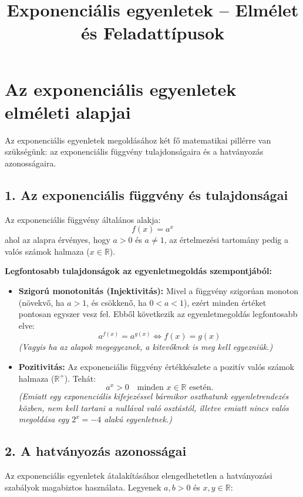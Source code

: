 \documentclass[11pt, a4paper]{article}
\title{\vspace{-1.5cm}\textbf{Exponenciális egyenletek -- Elmélet és Feladattípusok}}
\author{}
\date{}
\begin{document}
\maketitle
\vspace{-1.5cm}

\section*{Az exponenciális egyenletek elméleti alapjai}

Az exponenciális egyenletek megoldásához két fő matematikai pillérre van szükségünk: az exponenciális függvény tulajdonságaira és a hatványozás azonosságaira.

\subsection*{1. Az exponenciális függvény és tulajdonságai}

Az exponenciális függvény általános alakja:
\[ f(x) = a^x \]
ahol az alapra érvényes, hogy $a > 0$ és $a \neq 1$, az értelmezési tartomány pedig a valós számok halmaza ($x \in \mathbb{R}$).

\textbf{Legfontosabb tulajdonságok az egyenletmegoldás szempontjából:}
\begin{itemize}
    \item \textbf{Szigorú monotonitás (Injektivitás):} Mivel a függvény szigorúan monoton (növekvő, ha $a > 1$, és csökkenő, ha $0 < a < 1$), ezért minden értéket pontosan egyszer vesz fel. Ebből következik az egyenletmegoldás legfontosabb elve:
    \[ a^{f(x)} = a^{g(x)} \iff f(x) = g(x) \]
    \textit{(Vagyis ha az alapok megegyeznek, a kitevőknek is meg kell egyezniük.)}
    
    \item \textbf{Pozitivitás:} Az exponenciális függvény értékkészlete a pozitív valós számok halmaza ($\mathbb{R}^+$). Tehát:
    \[ a^x > 0 \quad \text{minden } x \in \mathbb{R} \text{ esetén.} \]
    \textit{(Emiatt egy exponenciális kifejezéssel bármikor oszthatunk egyenletrendezés közben, nem kell tartani a nullával való osztástól, illetve emiatt nincs valós megoldása egy $2^x = -4$ alakú egyenletnek.)}
\end{itemize}

\subsection*{2. A hatványozás azonosságai}

Az exponenciális egyenletek átalakításához elengedhetetlen a hatványozási szabályok magabiztos használata. Legyenek $a, b > 0$ és $x, y \in \mathbb{R}$:
\end{document}
